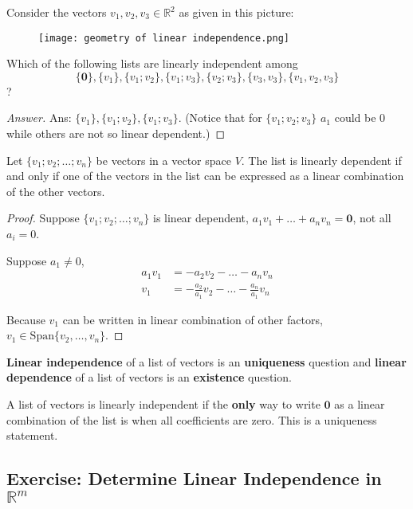 \documentclass{package/notes}
\begin{document}
\begin{problem}
    Consider the vectors $v_1, v_2, v_3\in \mathbb{R}^2$ as given in this picture:
    \begin{figure}[h]
        \centering
        \texttt{[image: geometry of linear independence.png]}

        \label{Geometry of Linear Independence}
    \end{figure}

    Which of the following lists are linearly independent among $$\{\boldsymbol{0}\}, \{v_1\}, \{v_1;v_2\}, \{v_1;v_3\}, \{v_2;v_3\}, \{v_3, v_3\}, \{v_1,v_2, v_3\}$$?
\end{problem}
\begin{proof}[Answer]
Ans: $\{v_1\},\{v_1;v_2\},\{v_1;v_3\}$. (Notice that for $\{v_1;v_2;v_3\}$ $a_1$ could be 0 while others are not so linear dependent.)
\end{proof}

\begin{proposition}

Let $\{v_1;v_2;\dots ; v_n\}$ be vectors in a vector space $V$. The list is linearly dependent if and only if one of the vectors in the list can be expressed as a linear combination of the other vectors.
\end{proposition}
\begin{proof}
Suppose $\{v_1;v_2;\dots ; v_n\}$ is linear dependent, $a_1v_1+\dots +a_nv_n=\boldsymbol{0}$, not all $a_i=0$.

Suppose $a_1\neq 0$, 
\begin{align*}
    a_1v_1&=-a_2v_2-\dots -a_nv_n\\
    v_1&=-\frac{a_2}{a_1}v_2-\dots -\frac{a_n}{a_1}v_n
\end{align*}

Because $v_1$ can be written in linear combination of other factors, $v_1\in \mathrm{Span}\{v_2, \dots , v_n\}$.
\end{proof}

\textbf{Linear independence} of a list of vectors is an \textbf{uniqueness} question and \textbf{linear dependence} of a list of vectors is an \textbf{existence} question.

A list of vectors is linearly independent if the \textbf{only} way to write $\boldsymbol{0}$ as a linear combination of the list is when all coefficients are zero. This is a uniqueness statement.

\subsection{Exercise: Determine Linear Independence in $\mathbb{R}^m$}
\end{document}
